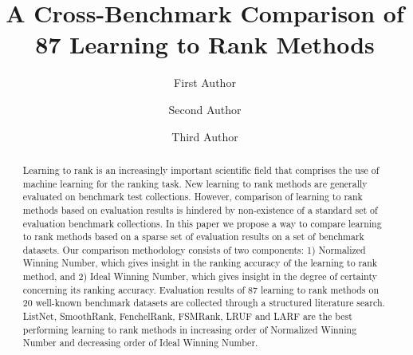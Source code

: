 \documentclass{llncs}
\begin{document}
\title{A Cross-Benchmark Comparison of 87 Learning to Rank Methods}
\author{First Author \and Second Author \and Third Author}

%
%
%
\maketitle
\begin{abstract}
Learning to rank is an increasingly important scientific field that comprises the use of machine learning for the ranking task. New learning to rank methods are generally evaluated on benchmark test collections. However, comparison of learning to rank methods based on evaluation results is hindered by non-existence of a standard set of evaluation benchmark collections. In this paper we propose a way to compare learning to rank methods based on a sparse set of evaluation results on a set of benchmark datasets. Our comparison methodology consists of two components: 1) Normalized Winning Number, which gives insight in the ranking accuracy of the learning to rank method, and 2) Ideal Winning Number, which gives insight in the degree of certainty concerning its ranking accuracy. Evaluation results of 87 learning to rank methods on 20 well-known benchmark datasets are collected through a structured literature search. ListNet, SmoothRank, FenchelRank, FSMRank, LRUF and LARF are the best performing learning to rank methods in increasing order of Normalized Winning Number and decreasing order of Ideal Winning Number.
\end{abstract}
\end{document}
